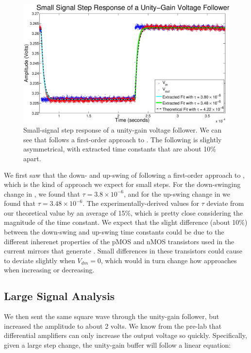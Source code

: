\begin{figure}[H]
\centering
\includegraphics[width=\linewidth]{../Figures/Exp3P2.eps}
\caption{Small-signal step response of a unity-gain voltage follower. We can see that \Vout follows a first-order approach to \Vin. The following is slightly asymmetrical, with extracted time constants that are about 10\% apart.}
\label{fig:exp3p2}
\end{figure}

We first saw that the down- and up-swing of \Vout following a first-order approach to \Vin, which is the kind of approach we expect for small steps. For the down-swinging change in \Vout, we found that $\tau = 3.8 \times 10^{-6}$, and for the up-swing change in \Vout we found that $\tau = 3.48 \times 10^{-6}$. The experimentally-derived values for $\tau$ deviate from our theoretical value by an average of 15\%, which is pretty close considering the magnitude of the time constant. We expect that the slight difference (about 10\%) between the down-swing and up-swing time constants could be due to the different inherenet properties of the pMOS and nMOS transistors used in the current mirrors that generate \Vout. Small differences in these transistors could cause \Vout to deviate slightly when $V_{dm} = 0$, which would in turn change how \Vout approaches \Vin when increasing or decreasing.

\subsection*{Large Signal Analysis}


We then sent the same square wave through the unity-gain follower, but increased the amplitude to about 2 volts. We know from the pre-lab that differential amplifiers can only increase the output voltage so quickly. Specifically, given a large step change, the unity-gain buffer will follow a linear equation:

